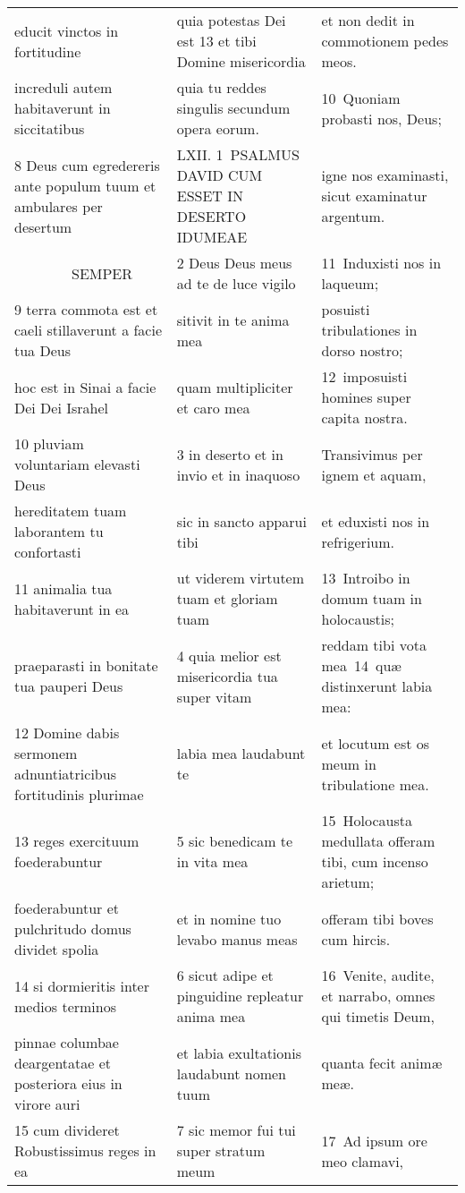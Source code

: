 \documentclass{article}
\begin{document}
\begin{longtable}{@{}p{}p{}p{}@{}}
educit vinctos in fortitudine	&	quia potestas Dei est 13 et tibi Domine misericordia	&	et non dedit in commotionem pedes meos.	\\
increduli autem habitaverunt in siccitatibus	&	quia tu reddes singulis secundum opera eorum.	&	10 Quoniam probasti nos, Deus;	\\
8 Deus cum egredereris ante populum tuum et ambulares per desertum	&	LXII. 1 PSALMUS DAVID CUM ESSET IN DESERTO IDUMEAE	&	igne nos examinasti, sicut examinatur argentum.	\\
    SEMPER	&	2 Deus Deus meus ad te de luce vigilo	&	11 Induxisti nos in laqueum;	\\
9 terra commota est et caeli stillaverunt a facie tua Deus	&	sitivit in te anima mea	&	posuisti tribulationes in dorso nostro;	\\
hoc est in Sinai a facie Dei Dei Israhel	&	quam multipliciter et caro mea	&	12 imposuisti homines super capita nostra.	\\
10 pluviam voluntariam elevasti Deus	&	3 in deserto et in invio et in inaquoso	&	Transivimus per ignem et aquam,	\\
hereditatem tuam laborantem tu confortasti	&	sic in sancto apparui tibi	&	et eduxisti nos in refrigerium.	\\
11 animalia tua habitaverunt in ea	&	ut viderem virtutem tuam et gloriam tuam	&	13 Introibo in domum tuam in holocaustis;	\\
praeparasti in bonitate tua pauperi Deus	&	4 quia melior est misericordia tua super vitam	&	reddam tibi vota mea 14 quæ distinxerunt labia mea:	\\
12 Domine dabis sermonem adnuntiatricibus fortitudinis plurimae	&	labia mea laudabunt te	&	et locutum est os meum in tribulatione mea.	\\
13 reges exercituum foederabuntur	&	5 sic benedicam te in vita mea	&	15 Holocausta medullata offeram tibi, cum incenso arietum;	\\
foederabuntur et pulchritudo domus dividet spolia	&	et in nomine tuo levabo manus meas	&	offeram tibi boves cum hircis.	\\
14 si dormieritis inter medios terminos	&	6 sicut adipe et pinguidine repleatur anima mea	&	16 Venite, audite, et narrabo, omnes qui timetis Deum,	\\
pinnae columbae deargentatae et posteriora eius in virore auri	&	et labia exultationis laudabunt nomen tuum	&	quanta fecit animæ meæ.	\\
15 cum divideret Robustissimus reges in ea	&	7 sic memor fui tui super stratum meum	&	17 Ad ipsum ore meo clamavi,	\\

\end{longtable}
\end{document}
